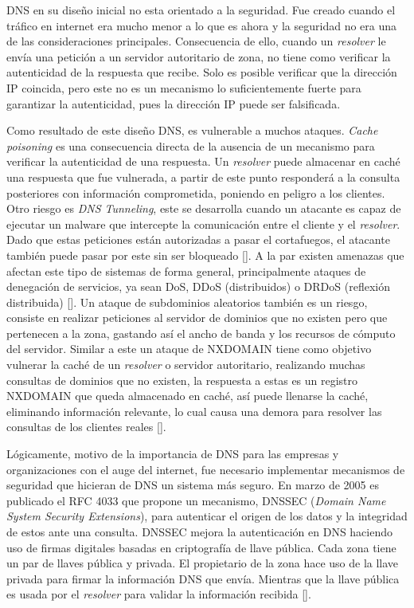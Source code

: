 DNS en su diseño inicial no esta orientado a la seguridad. Fue creado cuando el tráfico en internet era mucho menor a lo que es ahora y la seguridad no era una de las consideraciones principales. Consecuencia de ello, cuando un \textit{resolver} le envía una petición a un servidor autoritario de zona, no tiene como verificar la autenticidad de la respuesta que recibe. Solo es posible verificar que la dirección IP coincida, pero este no es un mecanismo lo suficientemente fuerte para garantizar la autenticidad, pues la dirección IP puede ser falsificada.

Como resultado de este diseño DNS, es vulnerable a muchos ataques. \textit{Cache poisoning} es una consecuencia directa de la ausencia de un mecanismo para verificar la autenticidad de una respuesta. Un \textit{resolver} puede almacenar en caché una respuesta que fue vulnerada, a partir de este punto responderá a la consulta posteriores con información comprometida, poniendo en peligro a los clientes. Otro riesgo es \textit{DNS Tunneling}, este se desarrolla cuando un atacante es capaz de ejecutar un malware que intercepte la comunicación entre el cliente y el \textit{resolver}. Dado que estas peticiones están autorizadas a pasar el cortafuegos, el atacante también puede pasar por este sin ser bloqueado [\cite{dns-tunneling}]. A la par existen amenazas que afectan este tipo de sistemas de forma general, principalmente ataques de denegación de servicios, ya sean DoS, DDoS (distribuidos) o DRDoS (reflexión distribuida) [\cite{dns-attacks}]. Un ataque de subdominios aleatorios también es un riesgo, consiste en realizar peticiones al servidor de dominios que no existen pero que pertenecen a la zona, gastando así el ancho de banda y los recursos de cómputo del servidor. Similar a este un ataque de NXDOMAIN tiene como objetivo vulnerar la caché de un \textit{resolver} o servidor autoritario, realizando muchas consultas de dominios que no existen, la respuesta a estas es un registro NXDOMAIN que queda almacenado en caché, así puede llenarse la caché, eliminando información relevante, lo cual causa una demora para resolver las consultas de los clientes reales [\cite{dns-attacks-ident-prot}].

Lógicamente, motivo de la importancia de DNS para las empresas y organizaciones con el auge del internet, fue necesario implementar mecanismos de seguridad que hicieran de DNS un sistema más seguro. En marzo de 2005 es publicado el RFC 4033 que propone un mecanismo, DNSSEC (\textit{Domain Name System Security Extensions}), para autenticar el origen de los datos y la integridad de estos ante una consulta. DNSSEC mejora la autenticación en DNS haciendo uso de firmas digitales basadas en criptografía de llave pública. Cada zona tiene un par de llaves pública y privada. El propietario de la zona hace uso de la llave privada para firmar la información DNS que envía. Mientras que la llave pública es usada por el \textit{resolver} para validar la información recibida [\cite{new-approach-dnssec}].

